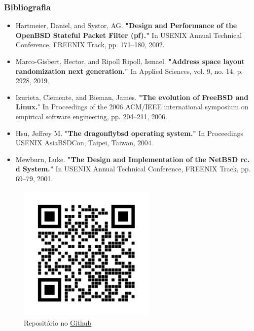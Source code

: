 \documentclass[9pt,xcolor=table]{beamer}
\begin{document}
\begin{frame}
  \frametitle{Bibliografia}
  \begin{itemize}
    \item Hartmeier, Daniel, and Systor, AG. \textbf{"Design and Performance of the OpenBSD Stateful Packet Filter (pf)."} In USENIX Annual Technical Conference, FREENIX Track, pp. 171--180, 2002.
    \item Marco-Gisbert, Hector, and Ripoll Ripoll, Ismael. \textbf{"Address space layout randomization next generation."} In Applied Sciences, vol. 9, no. 14, p. 2928, 2019.
    \item Izurieta, Clemente, and Bieman, James. \textbf{"The evolution of FreeBSD and Linux.}" In Proceedings of the 2006 ACM/IEEE international symposium on empirical software engineering, pp. 204--211, 2006.
    \item Hsu, Jeffrey M. \textbf{"The dragonflybsd operating system."} In Proceedings USENIX AsiaBSDCon, Taipei, Taiwan, 2004.
    \item Mewburn, Luke. \textbf{"The Design and Implementation of the NetBSD rc. d System."} In USENIX Annual Technical Conference, FREENIX Track, pp. 69--79, 2001.
  \end{itemize}
\end{frame}
\begin{frame}
\begin{figure}
\centering
\includegraphics[width=0.6\textwidth]{imagens/frame.png}
\caption{Repositório no \href{https://github.com/pigor12/latex-openbsd}{Github}}
\end{figure}
\end{frame}
\end{document}

